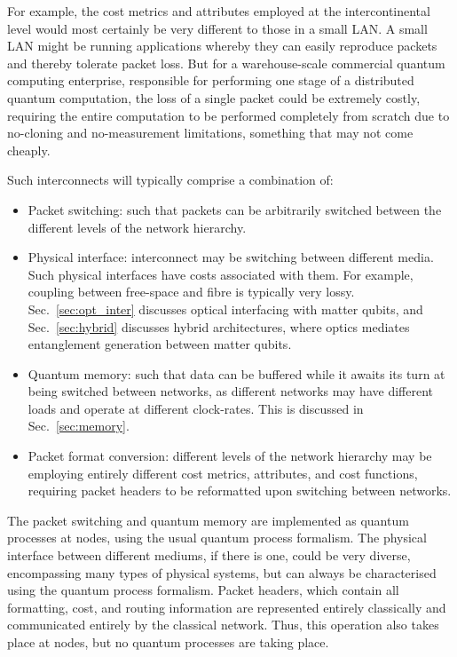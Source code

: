 \documentclass[aps, rmp, twocolumn, amsmath, amssymb, nofootinbib, superscriptaddress, longbibliography, floatfix, table-of-contents, eqsecnum]{revtex4-1}
\begin{document}
For example, the cost metrics and attributes employed at the intercontinental level would most certainly be very different to those in a small LAN. A small LAN might be running applications whereby they can easily reproduce packets and thereby tolerate packet loss. But for a warehouse-scale commercial quantum computing enterprise, responsible for performing one stage of a distributed quantum computation, the loss of a single packet could be extremely costly, requiring the entire computation to be performed completely from scratch due to no-cloning and no-measurement limitations, something that may not come cheaply.

Such interconnects will typically comprise a combination of:
\begin{itemize}
\item Packet switching: such that packets can be arbitrarily switched between the different levels of the network hierarchy.
\item Physical interface: interconnect may be switching between different media. Such physical interfaces have costs associated with them. For example, coupling between free-space and fibre is typically very lossy. Sec.~\ref{sec:opt_inter} discusses optical interfacing with matter qubits, and Sec.~\ref{sec:hybrid} discusses hybrid architectures, where optics mediates entanglement generation between matter qubits.
\item Quantum memory: such that data can be buffered while it awaits its turn at being switched between networks, as different networks may have different loads and operate at different clock-rates. This is discussed in Sec.~\ref{sec:memory}.
\item Packet format conversion: different levels of the network hierarchy may be employing entirely different cost metrics, attributes, and cost functions, requiring packet headers to be reformatted upon switching between networks.
\end{itemize}

The packet switching and quantum memory are implemented as quantum processes at nodes, using the usual quantum process formalism. The physical interface between different mediums, if there is one, could be very diverse, encompassing many types of physical systems, but can always be characterised using the quantum process formalism. Packet headers, which contain all formatting, cost, and routing information are represented entirely classically and communicated entirely by the classical network. Thus, this operation also takes place at nodes, but no quantum processes are taking place.
\end{document}

